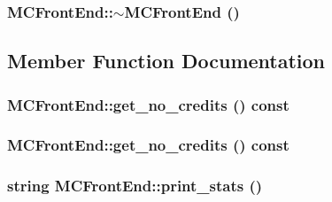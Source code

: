 \hypertarget{classMCFrontEnd_a6661a18919e7ef025ff32c955243b5d}{
\subsubsection[{$\sim$MCFrontEnd}]{\setlength{\rightskip}{0pt plus 5cm}MCFrontEnd::$\sim$MCFrontEnd ()}}
\label{classMCFrontEnd_a6661a18919e7ef025ff32c955243b5d}




\subsection{Member Function Documentation}
\hypertarget{classMCFrontEnd_9db80e378e0c7255bf66d43e2350cc15}{
\subsubsection[{get\_\-no\_\-credits}]{ MCFrontEnd::get\_\-no\_\-credits () const}}
\label{classMCFrontEnd_9db80e378e0c7255bf66d43e2350cc15}


\hypertarget{classMCFrontEnd_9db80e378e0c7255bf66d43e2350cc15}{
\subsubsection[{get\_\-no\_\-credits}]{ MCFrontEnd::get\_\-no\_\-credits () const}}
\label{classMCFrontEnd_9db80e378e0c7255bf66d43e2350cc15}


\hypertarget{classMCFrontEnd_38750cc156a8b88225c58b1c08e4f83e}{
\subsubsection[{print\_\-stats}]{\setlength{\rightskip}{0pt plus 5cm}string MCFrontEnd::print\_\-stats ()}}
\label{classMCFrontEnd_38750cc156a8b88225c58b1c08e4f83e}




